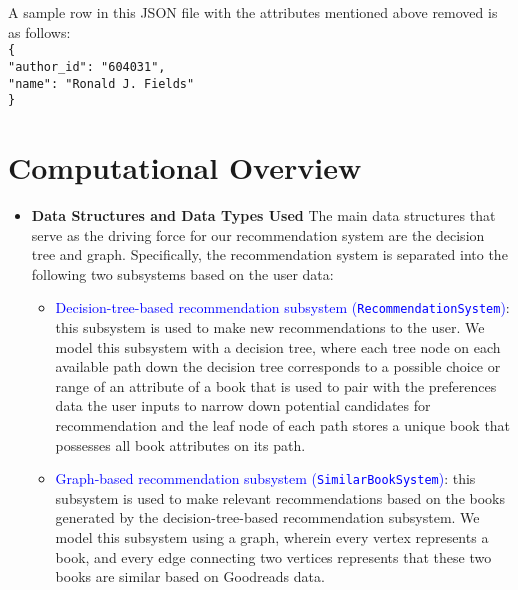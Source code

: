 \documentclass[fontsize=11pt]{article}
\begin{document}
\begin{enumerate}
A sample row in this JSON file with the attributes mentioned above removed is as follows: \\
\texttt{\{\\
"author\_id": "604031", \\
"name": "Ronald J. Fields"\\
\}} \\

\end{enumerate}

\section*{Computational Overview}

\begin{itemize}

\item \textbf{Data Structures and Data Types Used }The main data structures that serve as the driving force for our recommendation system are the decision tree and graph. Specifically, the recommendation system is separated into the following two subsystems based on the user data:
\begin{itemize}
\item \textcolor{blue}{Decision-tree-based recommendation subsystem (\texttt{RecommendationSystem})}: this subsystem is used to make new recommendations to the user. We model this subsystem with a decision tree, where each tree node on each available path down the decision tree corresponds to a possible choice or range of an attribute of a book that is used to pair with the preferences data the user inputs to narrow down potential candidates for recommendation and the leaf node of each path stores a unique book that possesses all book attributes on its path.

\item \textcolor{blue}{Graph-based recommendation subsystem (\texttt{SimilarBookSystem})}: this subsystem is used to make relevant recommendations based on the books generated by the decision-tree-based recommendation subsystem. We model this subsystem using a graph, wherein every vertex represents a book, and every edge connecting two vertices represents that these two books are similar based on Goodreads data.
\end{itemize}


\end{itemize}
\end{document}
